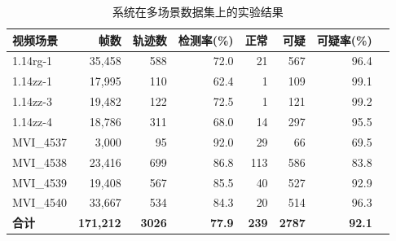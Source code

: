 
\begin{table}[htbp]
\centering
\caption{系统在多场景数据集上的实验结果}
\label{tab:experiment_results}
\begin{tabular}{lrrrrrrr}
\toprule
视频场景 & 帧数 & 轨迹数 & 检测率(\%) & 正常 & 可疑 & 可疑率(\%) \\
\midrule
1.14rg-1 & 35,458 & 588 & 72.0 & 21 & 567 & 96.4 \\
1.14zz-1 & 17,995 & 110 & 62.4 & 1 & 109 & 99.1 \\
1.14zz-3 & 19,482 & 122 & 72.5 & 1 & 121 & 99.2 \\
1.14zz-4 & 18,786 & 311 & 68.0 & 14 & 297 & 95.5 \\
MVI_4537 & 3,000 & 95 & 92.0 & 29 & 66 & 69.5 \\
MVI_4538 & 23,416 & 699 & 86.8 & 113 & 586 & 83.8 \\
MVI_4539 & 19,408 & 567 & 85.5 & 40 & 527 & 92.9 \\
MVI_4540 & 33,667 & 534 & 84.3 & 20 & 514 & 96.3 \\
\midrule
\textbf{合计} & \textbf{171,212} & \textbf{3026} & \textbf{77.9} & \textbf{239} & \textbf{2787} & \textbf{92.1} \\
\bottomrule
\end{tabular}
\end{table}
